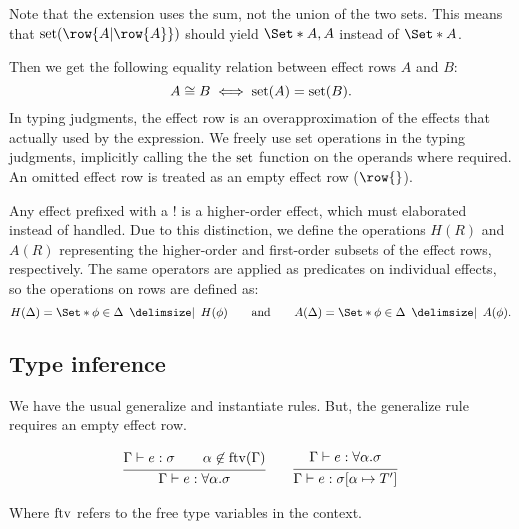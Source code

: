Note that the extension uses the sum, not the union of the two sets. This means that $\set(\row{A | \row{A}})$ should yield $\S{A, A}$ instead of $\S{A}$.

Then we get the following equality relation between effect rows $A$ and $B$:
\[ A \cong B \iff \operatorname{set}(A) = \operatorname{set}(B). \]
In typing judgments, the effect row is an overapproximation of the effects that actually used by the expression. We freely use set operations in the typing judgments, implicitly calling the the $\operatorname{set}$ function on the operands where required. An omitted effect row is treated as an empty effect row ($\row{}$).

Any effect prefixed with a $!$ is a higher-order effect, which must elaborated instead of handled. Due to this distinction, we define the operations $H(R)$ and $A(R)$ representing the higher-order and first-order subsets of the effect rows, respectively. The same operators are applied as predicates on individual effects, so the operations on rows are defined as:
\[ 
    H(\Delta) = \S{ \phi \in \Delta \given H(\phi) }
    \qquad
    \text{and}
    \qquad
    A(\Delta) = \S{ \phi \in \Delta \given A(\phi) }.
\]

\subsection{Type inference}

We have the usual generalize and instantiate rules. But, the generalize rule requires an empty effect row.


\begin{gather*}
    \infer{
        \Gamma \vdash e : \forall \alpha. \sigma
    }{
        \Gamma \vdash e : \sigma
        \qquad
        \alpha \not\in \ftv(\Gamma)
    }
    \qquad
    \infer{
        \Gamma \vdash e : \sigma[\alpha \mapsto T']
    }{
        \Gamma \vdash e : \forall \alpha. \sigma
    }
\end{gather*}

Where $\operatorname*{ftv}$ refers to the free type variables in the context.

